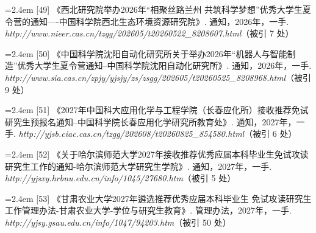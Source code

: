 {\vspace{0.6pt}
\vspace{3.5pt}\par
\nopagebreak\vspace{1pt}
\noindent\hangindent=2.4em \label{src:S0054}{\color{cAccent}[49]} 《西北研究院举办2026年“相聚丝路兰州 共筑科学梦想”优秀大学生夏令营的通知----中国科学院西北生态环境资源研究院》. 通知，2026年，一手. \textit{http://www.nieer.cas.cn/tzgg/202605/t20260522\_8208607.html}（被引 7 处）\par
\vspace{0.6pt}
\noindent\hangindent=2.4em \label{src:S0056}{\color{cAccent}[50]} 《中国科学院沈阳自动化研究所关于举办2026年“机器人与智能制造”优秀大学生夏令营通知--中国科学院沈阳自动化研究所》. 通知，2026年，一手. \textit{http://www.sia.cas.cn/zpjy/yjsjy/zs/zsgg/202605/t20260525\_8208968.html}（被引 9 处）\par
\vspace{0.6pt}
\noindent\hangindent=2.4em \label{src:S0057}{\color{cAccent}[51]} 《2027年中国科大应用化学与工程学院（长春应化所）接收推荐免试研究生预报名通知--中国科学院长春应用化学研究所教育处》. 通知，2027年，一手. \textit{http://yjsb.ciac.cas.cn/tzgg/202608/t20260825\_854580.html}（被引 6 处）\par
\vspace{0.6pt}
\vspace{3.5pt}\par
\nopagebreak\vspace{1pt}
\noindent\hangindent=2.4em \label{src:S0058}{\color{cAccent}[52]} 《关于哈尔滨师范大学2027年接收推荐优秀应届本科毕业生免试攻读研究生工作的通知-哈尔滨师范大学研究生学院》. 通知，2027年，一手. \textit{http://yjsxy.hrbnu.edu.cn/info/1045/27680.htm}（被引 5 处）\par
\vspace{0.6pt}
\vspace{3.5pt}\par
\nopagebreak\vspace{1pt}
\noindent\hangindent=2.4em \label{src:S0059}{\color{cAccent}[53]} 《甘肃农业大学2027年遴选推荐优秀应届本科毕业生 免试攻读研究生工作管理办法-甘肃农业大学-学位与研究生教育》. 管理办法，2027年，一手. \textit{http://yjsy.gsau.edu.cn/info/1047/94203.htm}（被引 50 处）\par
\vspace{0.6pt}
}

